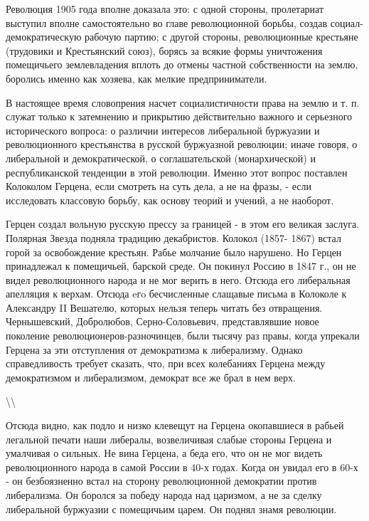 \documentclass[12pt]{article}
\newcommand\ellipsis{%
  \textbackslash\thinspace\textellipsis\textbackslash
}
\newcommand{\parnum}{(\arabic{parcount})}
\newcounter{parcount}
\newcommand\p{%
    \stepcounter{parcount}%
    \noindent\marginpar[]{\parnum}%
}
\newenvironment{parnumbers}{%
  \par%
  \everypar{\noindent \stepcounter{parcount}\marginpar[]{\parnum}}%
}{}
\begin{document}
\begin{parnumbers}
Революция 1905 года вполне доказала это: с одной стороны, пролетариат выступил вполне самостоятельно во главе революционной борьбы, создав социал-демократическую рабочую партию; с другой стороны, революционные крестьяне (трудовики и Крестьянский союз), борясь за всякие формы уничтожения помещичьего землевладения вплоть до отмены частной собственности на землю, боролись именно как хозяева, как мелкие предприниматели.

В настоящее время словопрения насчет социалистичности права на землю и т. п. служат только к затемнению и прикрытию действительно важного и серьезного исторического вопроса: о различии интересов либеральной буржуазии и революционного крестьянства в русской буржуазной революции; иначе говоря, о либеральной и демократической, о соглашательской (монархической) и республиканской тенденции в этой революции. Именно этот вопрос поставлен Колоколом Герцена, если смотреть на суть дела, а не на фразы, - если исследовать классовую борьбу, как основу теорий и учений, а не наоборот.

Герцен создал вольную русскую прессу за границей - в этом его великая заслуга. Полярная Звезда подняла традицию декабристов. Колокол (1857- 1867) встал горой за освобождение крестьян. Рабье молчание было нарушено. Но Герцен принадлежал к помещичьей, барской среде. Он покинул Россию в 1847 г., он не видел революционного народа и не мог верить в него. Отсюда его либеральная апелляция к верхам. Отсюда eгo бесчисленные слащавые письма в Колоколе к Александру II Вешателю, которых нельзя теперь читать без отвращения. Чернышевский, Добролюбов, Серно-Соловьевич, представлявшие новое поколение революционеров-разночинцев, были тысячу раз правы, когда упрекали Герцена за эти отступления от демократизма к либерализму. Однако справедливость требует сказать, что, при всех колебаниях Герцена между демократизмом и либерализмом, демократ все же брал в нем верх.
\end{parnumbers}

\ellipsis

\p Отсюда видно, как подло и низко клевещут на Герцена окопавшиеся в рабьей легальной печати наши либералы, возвеличивая слабые стороны Герцена и умалчивая о сильных. Не вина Герцена, а беда его, что он не мог видеть революционного народа в самой России в 40-х годах. Когда он увидал его в 60-х - он безбоязненно встал на сторону революционной демократии против либерализма. Он боролся за победу народа над царизмом, а не за сделку либеральной буржуазии с помещичьим царем. Он поднял знамя революции.
\end{document}
